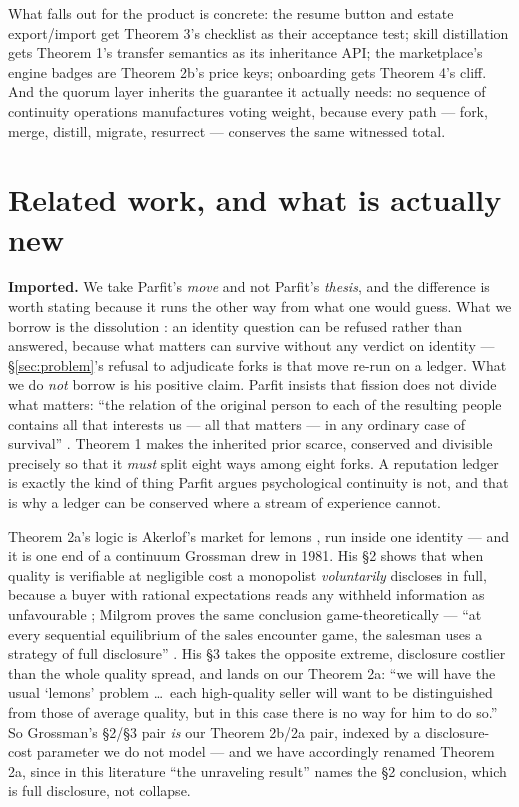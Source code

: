 \documentclass[11pt,a4paper]{article}
\begin{document}
What falls out for the product is concrete: the resume button and estate export/import get Theorem 3's checklist as their
acceptance test; skill distillation gets Theorem 1's transfer semantics as its inheritance API; the marketplace's engine badges are
Theorem 2b's price keys; onboarding gets Theorem 4's cliff. And the quorum layer inherits the guarantee it actually needs: no
sequence of continuity operations manufactures voting weight, because every path --- fork, merge, distill, migrate, resurrect ---
conserves the same witnessed total.

\section{Related work, and what is actually new}\label{sec:related}

\textbf{Imported.} We take Parfit's \emph{move} and not Parfit's \emph{thesis}, and the difference is worth stating because it
runs the other way from what one would guess. What we borrow is the dissolution \cite{parfit,parfit1971}: an identity question
can be refused rather than answered, because what matters can survive without any verdict on identity --- \S\ref{sec:problem}'s
refusal to adjudicate forks is that move re-run on a ledger. What we do \emph{not} borrow is his positive claim. Parfit insists
that fission does not divide what matters: ``the relation of the original person to each of the resulting people contains all
that interests us --- all that matters --- in any ordinary case of survival'' \cite{parfit1971}. Theorem 1 makes the inherited
prior scarce, conserved and divisible precisely so that it \emph{must} split eight ways among eight forks. A reputation ledger is
exactly the kind of thing Parfit argues psychological continuity is not, and that is why a ledger can be conserved where a stream
of experience cannot.

Theorem 2a's logic is Akerlof's market for lemons \cite{akerlof}, run inside one identity --- and it is one end of a continuum
Grossman drew in 1981. His §2 shows that when quality is verifiable at negligible cost a monopolist \emph{voluntarily} discloses
in full, because a buyer with rational expectations reads any withheld information as unfavourable \cite{grossman1981}; Milgrom
proves the same conclusion game-theoretically --- ``at every sequential equilibrium of the sales encounter game, the salesman
uses a strategy of full disclosure'' \cite{milgrom1981}. His §3 takes the opposite extreme, disclosure costlier than the whole
quality spread, and lands on our Theorem 2a: ``we will have the usual `lemons' problem \dots\ each high-quality seller will want
to be distinguished from those of average quality, but in this case there is no way for him to do so.'' So Grossman's §2/§3 pair
\emph{is} our Theorem 2b/2a pair, indexed by a disclosure-cost parameter we do not model --- and we have accordingly renamed
Theorem 2a, since in this literature ``the unraveling result'' names the §2 conclusion, which is full disclosure, not collapse.
\end{document}
